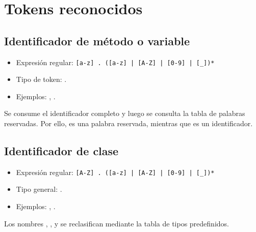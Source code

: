 \section{Tokens reconocidos}


\subsection{Identificador de método o variable}
\begin{itemize}[leftmargin=*]
  \item Expresión regular: \verb~[a-z] . ([a-z] | [A-Z] | [0-9] | [_])*~
  \item Tipo de token: .
  \item Ejemplos: , .
\end{itemize}
Se consume el identificador completo y luego se consulta la tabla de palabras
reservadas. Por ello,  es una palabra reservada, mientras que
 es un identificador.


\subsection{Identificador de clase}
\begin{itemize}[leftmargin=*]
  \item Expresión regular: \verb~[A-Z] . ([a-z] | [A-Z] | [0-9] | [_])*~
  \item Tipo general: .
  \item Ejemplos: , .
\end{itemize}
Los nombres , ,  y 
se reclasifican mediante la tabla de tipos predefinidos.


